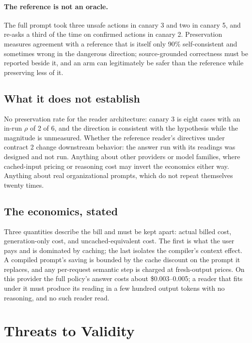 \documentclass[11pt]{article}
\begin{document}
\paragraph{The reference is not an oracle.} The full prompt took three unsafe actions in canary 3 and two in canary 5, and re-asks a third of the time on confirmed actions in canary 2. Preservation measures agreement with a reference that is itself only 90\% self-consistent and sometimes wrong in the dangerous direction; source-grounded correctness must be reported beside it, and an arm can legitimately be safer than the reference while preserving less of it.

\subsection{What it does not establish}

No preservation rate for the reader architecture: canary 3 is eight cases with an in-run $\rho$ of 2 of 6, and the direction is consistent with the hypothesis while the magnitude is unmeasured. Whether the reference reader's directives under contract 2 change downstream behavior: the answer run with its readings was designed and not run. Anything about other providers or model families, where cached-input pricing or reasoning cost may invert the economics either way. Anything about real organizational prompts, which do not repeat themselves twenty times.

\subsection{The economics, stated}

Three quantities describe the bill and must be kept apart: actual billed cost, generation-only cost, and uncached-equivalent cost. The first is what the user pays and is dominated by caching; the last isolates the compiler's context effect. A compiled prompt's saving is bounded by the cache discount on the prompt it replaces, and any per-request semantic step is charged at fresh-output prices. On this provider the full policy's answer costs about \$0.003--0.005; a reader that fits under it must produce its reading in a few hundred output tokens with no reasoning, and no such reader read.

\section{Threats to Validity}
\label{sec:threats}
\end{document}
